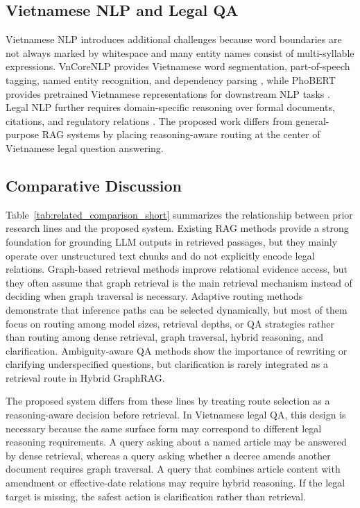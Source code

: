 \documentclass[11pt,twocolumn]{article}
\begin{document}
\subsection{Vietnamese NLP and Legal QA}

Vietnamese NLP introduces additional challenges because word
boundaries are not always marked by whitespace and many
entity names consist of multi-syllable expressions.
VnCoreNLP provides Vietnamese word segmentation,
part-of-speech tagging, named entity recognition, and
dependency parsing \cite{vu2018vncorenlp}, while PhoBERT
provides pretrained Vietnamese representations for
downstream NLP tasks \cite{nguyen2020phobert}. Legal NLP
further requires domain-specific reasoning over formal
documents, citations, and regulatory relations
\cite{chalkidis2020legalbert,zhong2020nlp_law}. The
proposed work differs from general-purpose RAG systems by
placing reasoning-aware routing at the center of Vietnamese
legal question answering.

\subsection{Comparative Discussion}
\label{subsec:related_comparison}

Table~\ref{tab:related_comparison_short} summarizes the
relationship between prior research lines and the proposed
system. Existing RAG methods provide a strong foundation for
grounding LLM outputs in retrieved passages, but they mainly
operate over unstructured text chunks and do not explicitly
encode legal relations. Graph-based retrieval methods
improve relational evidence access, but they often assume
that graph retrieval is the main retrieval mechanism instead
of deciding when graph traversal is necessary. Adaptive
routing methods demonstrate that inference paths can be
selected dynamically, but most of them focus on routing
among model sizes, retrieval depths, or QA strategies rather
than routing among dense retrieval, graph traversal, hybrid
reasoning, and clarification. Ambiguity-aware QA methods
show the importance of rewriting or clarifying
underspecified questions, but clarification is rarely
integrated as a retrieval route in Hybrid GraphRAG.

The proposed system differs from these lines by treating
route selection as a reasoning-aware decision before
retrieval. In Vietnamese legal QA, this design is necessary
because the same surface form may correspond to different
legal reasoning requirements. A query asking about a named
article may be answered by dense retrieval, whereas a query
asking whether a decree amends another document requires
graph traversal. A query that combines article content with
amendment or effective-date relations may require hybrid
reasoning. If the legal target is missing, the safest action
is clarification rather than retrieval.
\end{document}
